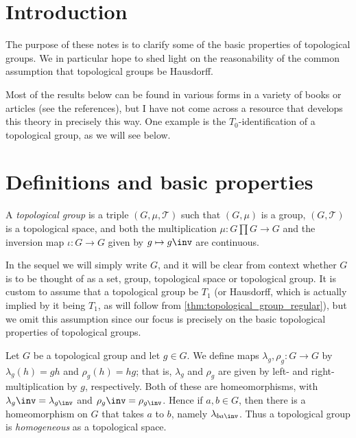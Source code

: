 \documentclass[article, a4paper, 11pt, oneside]{memoir}
\title{\doctitle}
\author{\docauthor}
\numberwithin{equation}{chapter}
\newcommand{\calT}{\mathcal{T}}
\begin{document}
\maketitle

\chapter{Introduction}

The purpose of these notes is to clarify some of the basic properties of topological groups. We in particular hope to shed light on the reasonability of the common assumption that topological groups be Hausdorff.

Most of the results below can be found in various forms in a variety of books or articles (see the references), but I have not come across a resource that develops this theory in precisely this way. One example is the $T_0$-identification of a topological group, as we will see below.


\chapter{Definitions and basic properties}

\begin{definition}
    \label{def:topological_group}
    A \emph{topological group} is a triple $(G, \mu, \calT)$ such that $(G, \mu)$ is a group, $(G, \calT)$ is a topological space, and both the multiplication $\mu \colon G \prod G \to G$ and the inversion map $\iota \colon G \to G$ given by $g \mapsto g\inv$ are continuous.
\end{definition}
%
In the sequel we will simply write $G$, and it will be clear from context whether $G$ is to be thought of as a set, group, topological space or topological group. It is custom to assume that a topological group be $T_1$ (or Hausdorff, which is actually implied by it being $T_1$, as will follow from \cref{thm:topological_group_regular}), but we omit this assumption since our focus is precisely on the basic topological properties of topological groups.

\newcommand{\leftmult}{\lambda}
\newcommand{\rightmult}{\rho}

Let $G$ be a topological group and let $g \in G$. We define maps $\leftmult_g, \rightmult_g \colon G \to G$ by $\leftmult_g(h) = gh$ and $\rightmult_g(h) = hg$; that is, $\leftmult_g$ and $\rightmult_g$ are given by left- and right-multiplication by $g$, respectively. Both of these are homeomorphisms, with $\leftmult_g\inv = \leftmult_{g\inv}$ and $\rightmult_g\inv = \rightmult_{g\inv}$. Hence if $a, b \in G$, then there is a homeomorphism on $G$ that takes $a$ to $b$, namely $\leftmult_{ba\inv}$. Thus a topological group is \emph{homogeneous} as a topological space.
\end{document}
